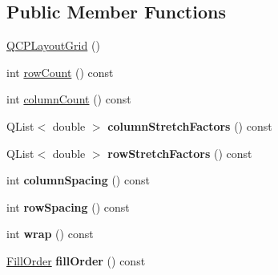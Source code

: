 \subsection*{Public Member Functions}
\begin{DoxyCompactItemize}
\item 
\hyperlink{classQCPLayoutGrid_ab2a4c1587dc8aed4c41c509c8d8d2a64}{Q\+C\+P\+Layout\+Grid} ()
\item 
int \hyperlink{classQCPLayoutGrid_af8e6c7a05864ebe610c87756c7b9079c}{row\+Count} () const 
\item 
int \hyperlink{classQCPLayoutGrid_ac39074eafd148b82d0762090f258189e}{column\+Count} () const 
\item 
Q\+List$<$ double $>$ {\bfseries column\+Stretch\+Factors} () const \hypertarget{classQCPLayoutGrid_a39bd7994d00687d1b9defef6f1bda835}{}\label{classQCPLayoutGrid_a39bd7994d00687d1b9defef6f1bda835}

\item 
Q\+List$<$ double $>$ {\bfseries row\+Stretch\+Factors} () const \hypertarget{classQCPLayoutGrid_a3744496abf73c8e3b464181d63bb20a7}{}\label{classQCPLayoutGrid_a3744496abf73c8e3b464181d63bb20a7}

\item 
int {\bfseries column\+Spacing} () const \hypertarget{classQCPLayoutGrid_a3de19753fdca81194458cb15156f7315}{}\label{classQCPLayoutGrid_a3de19753fdca81194458cb15156f7315}

\item 
int {\bfseries row\+Spacing} () const \hypertarget{classQCPLayoutGrid_abccdd33c1b284feb6df90fa02f23d9a3}{}\label{classQCPLayoutGrid_abccdd33c1b284feb6df90fa02f23d9a3}

\item 
int {\bfseries wrap} () const \hypertarget{classQCPLayoutGrid_aa7fc0bff4591a6be44af2fb038dd85d9}{}\label{classQCPLayoutGrid_aa7fc0bff4591a6be44af2fb038dd85d9}

\item 
\hyperlink{classQCPLayoutGrid_a7d49ee08773de6b2fd246edfed353cca}{Fill\+Order} {\bfseries fill\+Order} () const \hypertarget{classQCPLayoutGrid_a2ed8e2fc298652ec67d6a8848e58bad1}{}\label{classQCPLayoutGrid_a2ed8e2fc298652ec67d6a8848e58bad1}


\end{DoxyCompactItemize}
